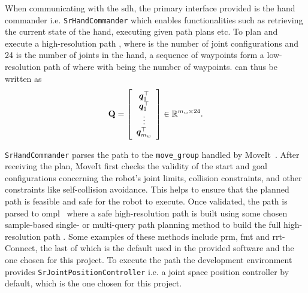 When communicating with the \gls{sdh}, the primary interface provided is the hand commander i.e. \texttt{SrHandCommander} which enables functionalities such as retrieving the current state of the hand, executing given path plans etc. To plan and execute a high-resolution path , where  is the number of joint configurations and \num{24} is the number of joints in the hand, a sequence of waypoints  form a low-resolution path of  where  with  being the number of waypoints.  can thus be written as
\begin{equation}\label{eq:waypoint-path-matrix}
	\bm{\mathrm{Q}} = 
		\left[\begin{array}{ccc}
			\bm{q}_1^\top \\
			\bm{q}_1^\top \\
			\vdots \\
			\bm{q}_{m_w}^\top
		\end{array}\right] \in\mathbb{R}^{m_w \times 24}.
\end{equation}

\texttt{SrHandCommander} parses the path to the \texttt{move\_group} handled by MoveIt~\cite{reducing-the-barrier-to-entry-of-complex-robotic-software:-a-moveit!-case-study}. After receiving the plan, MoveIt first checks the validity of the start and goal configurations concerning the robot's joint limits, collision constraints, and other constraints like self-collision avoidance. This helps to ensure that the planned path is feasible and safe for the robot to execute. Once validated, the path  is parsed to \gls{ompl}~\cite{the-open-motion-planning-library} where a safe high-resolution path is built using some chosen sample-based single- or multi-query path planning method to build the full high-resolution path . Some examples of these methods include \gls{prm}, \gls{fmt} and \gls{rrt}-Connect, the last of which is the default used in the provided software and the one chosen for this project. To execute the path the development environment provides \texttt{SrJointPositionController} i.e. a joint space position controller by default, which is the one chosen for this project. \medskip

